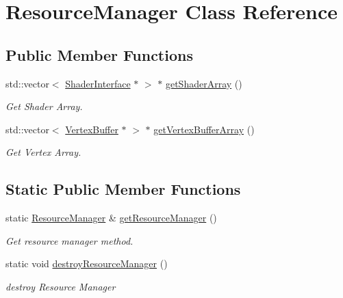 \hypertarget{class_resource_manager}{}\section{Resource\+Manager Class Reference}
\label{class_resource_manager}
\subsection*{Public Member Functions}
\begin{DoxyCompactItemize}
\item 
std\+::vector$<$ \hyperlink{class_shader_interface}{Shader\+Interface} $\ast$ $>$ $\ast$ \hyperlink{class_resource_manager_a76149a629ba8c22f26ad9d385e323af1}{get\+Shader\+Array} ()
\begin{DoxyCompactList}\small\item\em Get Shader Array. \end{DoxyCompactList}\item 
std\+::vector$<$ \hyperlink{class_vertex_buffer}{Vertex\+Buffer} $\ast$ $>$ $\ast$ \hyperlink{class_resource_manager_afb9595acc189aa88fccad22c5f483769}{get\+Vertex\+Buffer\+Array} ()
\begin{DoxyCompactList}\small\item\em Get Vertex Array. \end{DoxyCompactList}\end{DoxyCompactItemize}
\subsection*{Static Public Member Functions}
\begin{DoxyCompactItemize}
\item 
static \hyperlink{class_resource_manager}{Resource\+Manager} \& \hyperlink{class_resource_manager_ac7518dcf3792c23848c6cf93ce67e462}{get\+Resource\+Manager} ()
\begin{DoxyCompactList}\small\item\em Get resource manager method. \end{DoxyCompactList}\item 
static void \hyperlink{class_resource_manager_a95be72fdfb8965949f979846831eb4e1}{destroy\+Resource\+Manager} ()
\begin{DoxyCompactList}\small\item\em destroy Resource Manager \end{DoxyCompactList}\end{DoxyCompactItemize}


